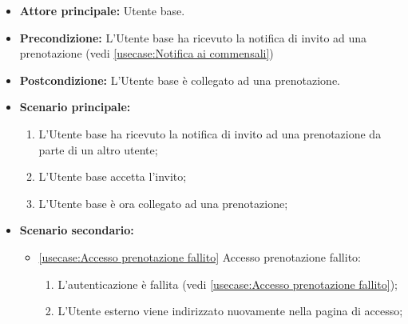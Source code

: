 \label{usecase:Accedi alla prenotazione}
\begin{itemize}
	\item \textbf{Attore principale:} Utente base.

	\item \textbf{Precondizione:} L'Utente base ha ricevuto la notifica di invito ad una prenotazione (vedi \autoref{usecase:Notifica ai commensali})

	\item \textbf{Postcondizione:} L'Utente base è collegato ad una prenotazione.

	\item \textbf{Scenario principale:}
	      \begin{enumerate}
		      \item L'Utente base ha ricevuto la notifica di invito ad una prenotazione da parte di un altro utente;
		      \item L'Utente base accetta l'invito;
		      \item L'Utente base è ora collegato ad una prenotazione;
	      \end{enumerate}

	\item \textbf{Scenario secondario:}
		  \begin{itemize}
			  \item \autoref{usecase:Accesso prenotazione fallito} Accesso prenotazione fallito:
			  \begin{enumerate}
				  \item L'autenticazione è fallita (vedi \autoref{usecase:Accesso prenotazione fallito});
				  \item L'Utente esterno viene indirizzato nuovamente nella pagina di accesso; 
			  \end{enumerate}	
		  \end{itemize}
\end{itemize}
